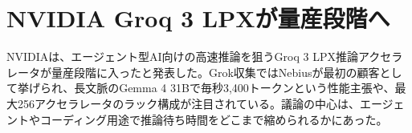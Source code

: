 \section{NVIDIA Groq 3 LPXが量産段階へ}
NVIDIAは、エージェント型AI向けの高速推論を狙うGroq 3 LPX推論アクセラレータが量産段階に入ったと発表した。Grok収集ではNebiusが最初の顧客として挙げられ、長文脈のGemma 4 31Bで毎秒3,400トークンという性能主張や、最大256アクセラレータのラック構成が注目されている。議論の中心は、エージェントやコーディング用途で推論待ち時間をどこまで縮められるかにあった。
